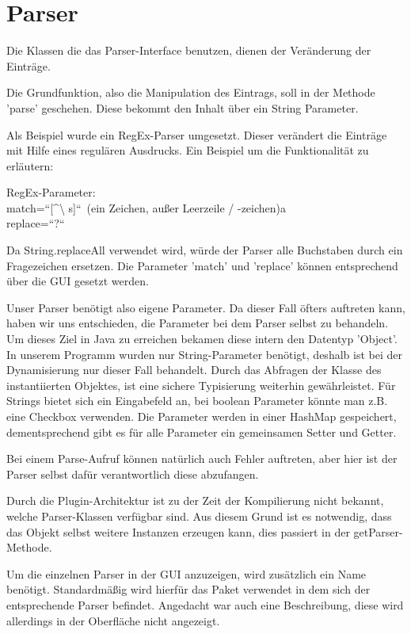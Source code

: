\documentclass[a4paper,11pt,abstracton,titlepage]{scrartcl}
\begin{document}
\section{Parser}
Die Klassen die das Parser-Interface benutzen, dienen der Veränderung der
Einträge.

Die Grundfunktion, also die Manipulation des Eintrags, soll in der Methode
'parse' geschehen. Diese bekommt den Inhalt über ein String Parameter. 

Als Beispiel wurde ein RegEx-Parser umgesetzt. Dieser verändert die Einträge mit
Hilfe eines regulären Ausdrucks. Ein Beispiel um die Funktionalität zu
erläutern: 

RegEx-Parameter:\\
match=\textquotedblleft [\textasciicircum \textbackslash
s]\textquotedblleft  \, (ein Zeichen, außer Leerzeile / -zeichen)a\\
replace=\textquotedblleft  ?\textquotedblleft 

Da String.replaceAll verwendet wird, würde der Parser alle Buchstaben durch ein
Fragezeichen ersetzen. Die Parameter 'match' und 'replace' können entsprechend
über die GUI gesetzt werden. 

Unser Parser benötigt also eigene Parameter. Da dieser Fall öfters auftreten
kann, haben wir uns entschieden, die Parameter bei dem Parser selbst zu
behandeln. Um dieses Ziel in Java zu erreichen bekamen diese intern den Datentyp
'Object'. In unserem Programm wurden nur String-Parameter benötigt, deshalb ist
bei der Dynamisierung nur dieser Fall behandelt. Durch das Abfragen der Klasse
des instantiierten Objektes, ist eine sichere Typisierung weiterhin
gewährleistet. Für Strings bietet sich ein Eingabefeld an, bei boolean Parameter
könnte man z.B. eine Checkbox verwenden. Die Parameter werden in einer HashMap
gespeichert, dementsprechend gibt es für alle Parameter ein gemeinsamen Setter
und Getter.

Bei einem Parse-Aufruf können natürlich auch Fehler auftreten, aber hier ist der
Parser selbst dafür verantwortlich diese abzufangen.

Durch die Plugin-Architektur ist zu der Zeit der Kompilierung nicht bekannt,
welche Parser-Klassen verfügbar sind. Aus diesem Grund ist es notwendig, dass
das Objekt selbst weitere Instanzen erzeugen kann, dies passiert in der
getParser-Methode.

Um die einzelnen Parser in der GUI anzuzeigen, wird zusätzlich ein Name
benötigt. Standardmäßig wird hierfür das Paket verwendet in dem sich der
entsprechende Parser befindet. Angedacht war auch eine Beschreibung, diese wird
allerdings in der Oberfläche nicht angezeigt.
\end{document}
